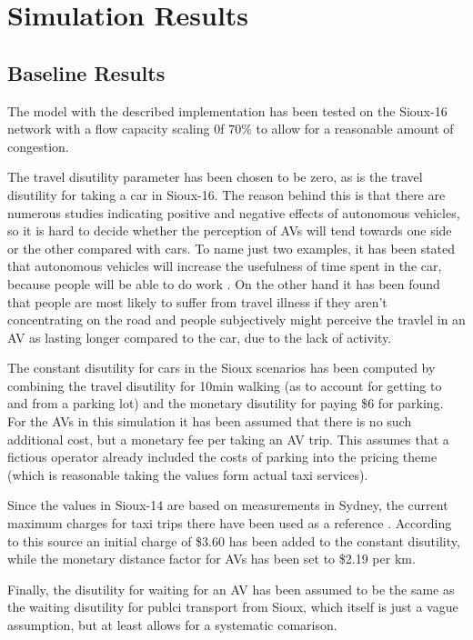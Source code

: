 \section{Simulation Results}
\label{sec:results}

\subsection{Baseline Results}

The model with the described implementation has been tested on the Sioux-16 network
with a flow capacity scaling 0f $70\%$ to allow for a reasonable amount of congestion.

The travel disutility parameter has been chosen to be zero, as is the travel
disutility for taking a car in Sioux-16. The reason behind this is that there are
numerous studies indicating positive and negative effects of autonomous vehicles, so
it is hard to decide whether the perception of AVs will tend towards one side or the
other compared with cars. To name just two examples, it has been stated that autonomous
vehicles will increase the usefulness of time spent in the car, because people will
be able to do work . On the other hand it has been found that people
are most likely to suffer from travel illness if they aren't concentrating on the
road  and people subjectively might perceive the travlel in an AV
as lasting longer compared to the car, due to the lack of activity.

The constant disutility for cars in the Sioux scenarios
has been computed by combining the travel disutility for 10min walking (as to
account for getting to and from a parking lot) and the monetary disutility for
paying \$6 for parking. For the AVs in this simulation it has been assumed that
there is no such additional cost, but a monetary fee per taking an AV trip. This
assumes that a fictious operator already included the costs of parking into the
pricing theme (which is reasonable taking the values form actual taxi services).

Since the values in Sioux-14 are based on measurements in Sydney, the current
maximum charges for taxi trips there have been used as a reference \citep{NSW2016}. According to this
source an initial charge of \$3.60 has been added to the constant disutility, while
the monetary distance factor for AVs has been set to \$2.19 per km.

Finally, the disutility for waiting for an AV has been assumed to be the same as
the waiting disutility for publci transport from Sioux, which itself is just a
vague assumption, but at least allows for a systematic comarison.

